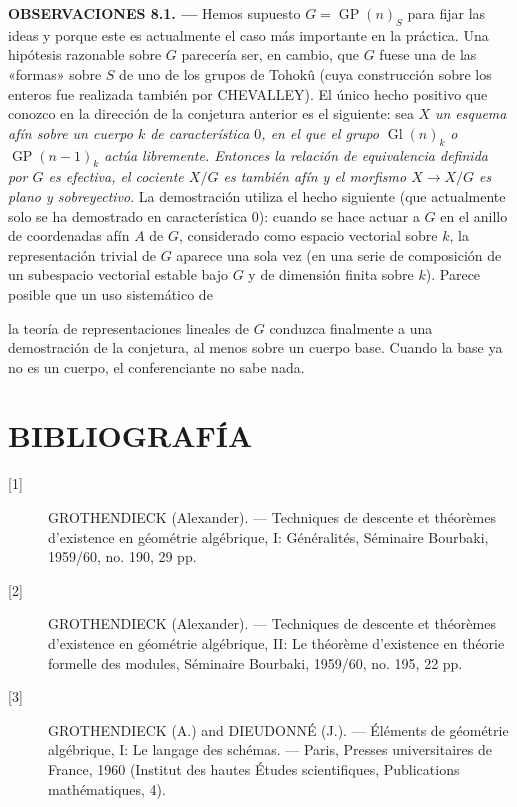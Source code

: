 \documentclass[11pt,twoside,openany]{book}
\numberwithin{equation}{section}
\newcommand{\src}[1]{%
  \phantomsection\hypertarget{src:#1}{}%
  \marginpar{\raggedleft\footnotesize\sffamily #1}%
}
\theoremstyle{plain}
\theoremstyle{definition}
\theoremstyle{remark}
\newcommand{\FgaUnitKey}{frontmatter}
\renewcommand{\src}[1]{%
  \phantomsection\hypertarget{src:\FgaUnitKey:#1}{}%
  \marginpar{\raggedleft\footnotesize\sffamily #1}%
}
\theoremstyle{plain}
\theoremstyle{definition}
\theoremstyle{remark}
\begin{document}
\medskip
\noindent\textbf{OBSERVACIONES 8.1. ---} Hemos supuesto
$G=\operatorname{GP}(n)_S$ para fijar las ideas y porque este es actualmente
el caso más importante en la práctica. Una hipótesis razonable sobre $G$
parecería ser, en cambio, que $G$ fuese una de las «formas» sobre $S$ de uno
de los grupos de Tohokû (cuya construcción sobre los enteros fue realizada
también por CHEVALLEY). El único hecho positivo que conozco en la dirección de
la conjetura anterior es el siguiente: sea $X$ \emph{un esquema afín sobre un
cuerpo $k$ de característica $0$, en el que el grupo
$\operatorname{Gl}(n)_k$ o $\operatorname{GP}(n-1)_k$ actúa libremente.
Entonces la relación de equivalencia definida por $G$ es efectiva, el
cociente $X/G$ es también afín y el morfismo $X\to X/G$ es plano y
sobreyectivo}. La demostración utiliza el hecho siguiente (que actualmente
solo se ha demostrado en característica $0$): cuando se hace actuar a $G$ en
el anillo de coordenadas afín $A$ de $G$, considerado como espacio vectorial
sobre $k$, la representación trivial de $G$ aparece una sola vez (en una
serie de composición de un subespacio vectorial estable bajo $G$ y de
dimensión finita sobre $k$). Parece posible que un uso sistemático de
\src{118}
la teoría de representaciones lineales de $G$ conduzca finalmente a una
demostración de la conjetura, al menos sobre un cuerpo base. Cuando la base ya
no es un cuerpo, el conferenciante no sabe nada.

\section*{BIBLIOGRAFÍA}

\begin{description}
\item[{[1]}] GROTHENDIECK (Alexander). --- Techniques de descente et théorèmes
d'existence en géométrie algébrique, I: Généralités, Séminaire Bourbaki,
1959/60, no. 190, 29 pp.

\item[{[2]}] GROTHENDIECK (Alexander). --- Techniques de descente et théorèmes
d'existence en géométrie algébrique, II: Le théorème d'existence en théorie
formelle des modules, Séminaire Bourbaki, 1959/60, no. 195, 22 pp.

\item[{[3]}] GROTHENDIECK (A.) and DIEUDONNÉ (J.). --- Éléments de géométrie
algébrique, I: Le langage des schémas. --- Paris, Presses universitaires de
France, 1960 (Institut des hautes Études scientifiques, Publications
mathématiques, 4).
\end{description}
\end{document}
